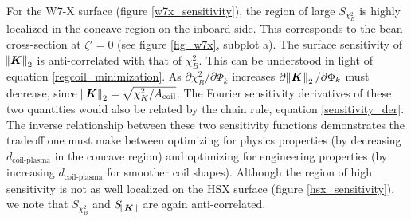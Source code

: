 \documentclass[aps,unsortedaddress]{revtex4-1}
\begin{document}
For the W7-X surface (figure \ref{w7x_sensitivity}), the region of large $S_{\chi^2_B}$ is highly localized in the concave region on the inboard side. This corresponds to the bean cross-section at $\zeta' = 0$ (see figure \ref{fig_w7x}, subplot a). The surface sensitivity of $\norm{\bm{K}}_2$ is anti-correlated with that of $\chi^2_B$. This can be understood in light of equation \ref{regcoil_minimization}. As $\partial \chi^2_B/\partial \Phi_k$ increases $\partial \norm{\bm{K}}_2/\partial \Phi_k$ must decrease, since $\norm{\bm{K}}_2 = \sqrt{ \chi^2_K/A_{\text{coil}}}$. The Fourier sensitivity derivatives of these two quantities would also be related by the chain rule, equation \ref{sensitivity_der}. The inverse relationship between these two sensitivity functions demonstrates the tradeoff one must make between optimizing for physics properties (by decreasing $d_{\text{coil-plasma}}$ in the concave region) and optimizing for engineering properties (by increasing $d_{\text{coil-plasma}}$ for smoother coil shapes). Although the region of high sensitivity is not as well localized on the HSX surface (figure \ref{hsx_sensitivity}), we note that $S_{\chi^2_B}$ and $S_{\norm{\bm{K}}}$ are again anti-correlated. 
\end{document}
